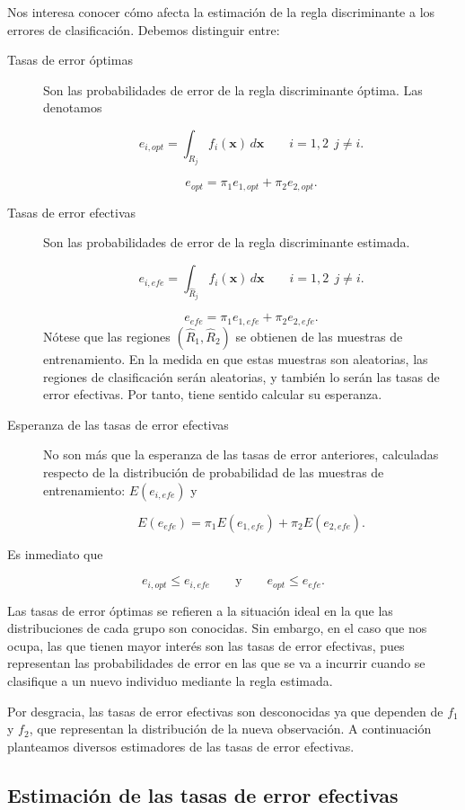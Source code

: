 \documentclass[
  a4paper,
  oneside]{scrbook}
\theoremstyle{definition}
\theoremstyle{definition}
\theoremstyle{definition}
\theoremstyle{definition}
\theoremstyle{remark}
\begin{document}
Nos interesa conocer cómo afecta la estimación de la regla discriminante
a los errores de clasificación. Debemos distinguir entre:

\begin{description}
\item[Tasas de error óptimas]
Son las probabilidades de error de la regla discriminante óptima.
Las denotamos

\[e_{i,opt}=\int_{R_j}f_i(\bm{x})\,d\bm{x}\qquad i=1,2\ \ j\neq i.\]

\[e_{opt}=\pi_1 e_{1,opt}+\pi_2 e_{2,opt}.\]
\item[Tasas de error efectivas]
Son las probabilidades de error de la regla discriminante estimada.

\[e_{i,efe}=\int_{\hat{R}_j}f_i(\bm{x})\,d\bm{x}\qquad i=1,2\ \ j\neq i.\]

\[e_{efe}=\pi_1 e_{1,efe}+\pi_2 e_{2,efe}.\] Nótese que las regiones
\((\hat{R}_1,\hat{R}_2)\) se obtienen de las muestras de
entrenamiento. En la medida en que estas muestras son aleatorias,
las regiones de clasificación serán aleatorias, y también lo serán
las tasas de error efectivas. Por tanto, tiene sentido calcular su
esperanza.
\item[Esperanza de las tasas de error efectivas]
No son más que la esperanza de las tasas de error anteriores,
calculadas respecto de la distribución de probabilidad de las
muestras de entrenamiento: \(E(e_{i,efe})\) y

\[E(e_{efe})=\pi_1 E(e_{1,efe})+\pi_2 E(e_{2,efe}).\]
\end{description}

Es inmediato que

\[e_{i,opt}\leq e_{i,efe}\qquad\mbox{y}\qquad e_{opt}\leq e_{efe}.\]

Las tasas de error óptimas se refieren a la situación ideal en la que
las distribuciones de cada grupo son conocidas. Sin embargo, en el caso
que nos ocupa, las que tienen mayor interés son las tasas de error
efectivas, pues representan las probabilidades de error en las que se va
a incurrir cuando se clasifique a un nuevo individuo mediante la regla
estimada.

Por desgracia, las tasas de error efectivas son desconocidas ya que
dependen de \(f_1\) y \(f_2\), que representan la distribución de la nueva
observación. A continuación planteamos diversos estimadores de las tasas
de error efectivas.

\subsection{Estimación de las tasas de error efectivas}\label{estimacion-de-las-tasas-de-error-efectivas}
\end{document}
